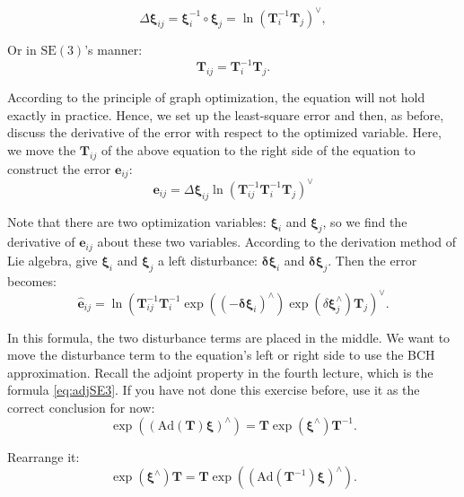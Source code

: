 \begin{equation}
	\Delta \bm{\xi}_{ij} = \bm{\xi}_i^{-1} \circ \bm{\xi}_j = \ln \left( \bm{T}_i^{-1} \bm{T}_j \right)^\vee,
\end{equation}

Or in $\mathrm{SE}(3)$'s manner:
\begin{equation}
	\bm{T}_{ij} =\bm{T}_i^{-1} \bm{T}_j.
\end{equation}

According to the principle of graph optimization, the equation will not hold exactly in practice. Hence, we set up the least-square error and then, as before, discuss the derivative of the error with respect to the optimized variable. Here, we move the $\bm{T}_{ij}$ of the above equation to the right side of the equation to construct the error $\bm{e}_{ij}$:
\begin{equation}
	\bm{e}_{ij} = \Delta \bm{\xi}_{ij} \ln \left( \bm{T}_{ij}^{-1} \bm{T}_i^{-1} \bm{T}_j \right)^\vee
\end{equation}

Note that there are two optimization variables: $\bm{\xi}_i$ and $\bm{\xi}_j$, so we find the derivative of $\bm{e}_{ij}$ about these two variables. According to the derivation method of Lie algebra, give $\bm{\xi}_i$ and $\bm{\xi}_j$ a left disturbance: $ \bm{\delta \xi}_i$ and $\bm{\delta \xi}_j$. Then the error becomes:
\begin{equation}
	\hat{ \bm{e}}_{ij} = \ln \left( \bm{T}_{ij}^{-1}  \bm{T}_i^{-1} \exp((-\bm{\delta \xi}_i)^\wedge) \exp(\delta \bm{\xi}_j^\wedge) \bm{T}_j  \right)^\vee.
\end{equation}

In this formula, the two disturbance terms are placed in the middle. We want to move the disturbance term to the equation's left or right side to use the BCH approximation. Recall the adjoint property in the fourth lecture, which is the formula \eqref{eq:adjSE3}. If you have not done this exercise before, use it as the correct conclusion for now:
\begin{equation}
	\exp \left( \left( \mathrm{Ad}(\bm{T}) \bm{\xi} \right) ^\wedge \right) = \bm{T} \exp(\bm{\xi}^\wedge)\bm{T}^{-1}.
\end{equation}

Rearrange it:
\begin{equation}
	\exp(\bm{\xi}^\wedge)\bm{T} = \bm{T} \exp \left( \left( \mathrm{Ad}(\bm{T}^{-1}) \bm{\xi} \right) ^\wedge \right) .
\end{equation}


